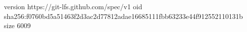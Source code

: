 version https://git-lfs.github.com/spec/v1
oid sha256:f0760bd5a51463f2d3ac2d77812adae16685111fbb63233e44f912552110131b
size 6009
